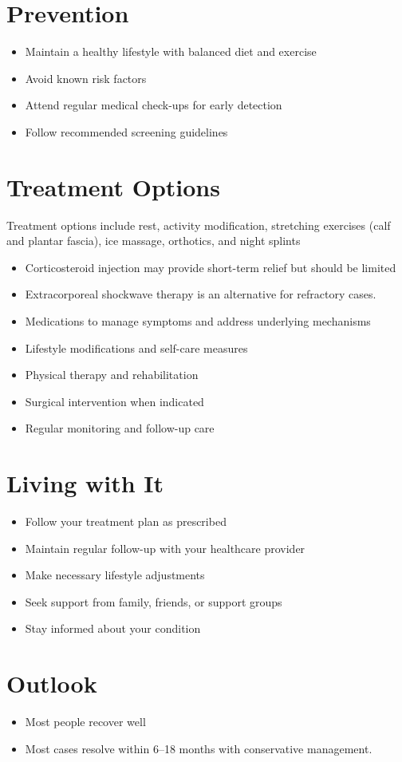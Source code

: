 \section{Prevention}
\begin{itemize}[noitemsep]
  \item Maintain a healthy lifestyle with balanced diet and exercise
  \item Avoid known risk factors
  \item Attend regular medical check-ups for early detection
  \item Follow recommended screening guidelines
\end{itemize}
\section{Treatment Options}
Treatment options include rest, activity modification, stretching exercises (calf and plantar fascia), ice massage, orthotics, and night splints

\begin{itemize}[noitemsep]
  \item Corticosteroid injection may provide short-term relief but should be limited
  \item Extracorporeal shockwave therapy is an alternative for refractory cases.
  \item Medications to manage symptoms and address underlying mechanisms
  \item Lifestyle modifications and self-care measures
  \item Physical therapy and rehabilitation
  \item Surgical intervention when indicated
  \item Regular monitoring and follow-up care
\end{itemize}
\section{Living with It}
\begin{itemize}[noitemsep]
  \item Follow your treatment plan as prescribed
  \item Maintain regular follow-up with your healthcare provider
  \item Make necessary lifestyle adjustments
  \item Seek support from family, friends, or support groups
  \item Stay informed about your condition
\end{itemize}
\section{Outlook}
\begin{itemize}[noitemsep]
  \item Most people recover well
  \item Most cases resolve within 6--18 months with conservative management.
\end{itemize}
